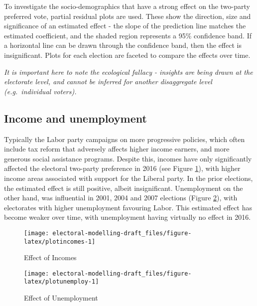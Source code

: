 \documentclass[openany]{book}
\begin{document}
To investigate the socio-demographics that have a strong effect on the two-party preferred vote, partial residual plots are used. These show the direction, size and significance of an estimated effect - the slope of the prediction line matches the estimated coefficient, and the shaded region represents a 95\% confidence band. If a horizontal line can be drawn through the confidence band, then the effect is insignificant. Plots for each election are faceted to compare the effects over time.

\emph{It is important here to note the ecological fallacy - insights are being drawn at the electorate level, and cannot be inferred for another disaggregate level (e.g.~individual voters).}

\hypertarget{income-and-unemployment}{%
\subsection{Income and unemployment}\label{income-and-unemployment}}

Typically the Labor party campaigns on more progressive policies, which often include tax reform that adversely affects higher income earners, and more generous social assistance programs. Despite this, incomes have only significantly affected the electoral two-party preference in 2016 (see Figure \ref{fig:plotincomes}), with higher income areas associated with support for the Liberal party. In the prior elections, the estimated effect is still positive, albeit insignificant. Unemployment on the other hand, was influential in 2001, 2004 and 2007 elections (Figure \ref{fig:plotunemploy}), with electorates with higher unemployment favouring Labor. This estimated effect has become weaker over time, with unemployment having virtually no effect in 2016.

\begin{figure}[h]

{\centering \texttt{[image: electoral-modelling-draft\_files/figure-latex/plotincomes-1]} 

}

\caption{Effect of Incomes}\label{fig:plotincomes}
\end{figure}

\begin{figure}[h]

{\centering \texttt{[image: electoral-modelling-draft\_files/figure-latex/plotunemploy-1]} 

}

\caption{Effect of Unemployment}\label{fig:plotunemploy}
\end{figure}
\end{document}
